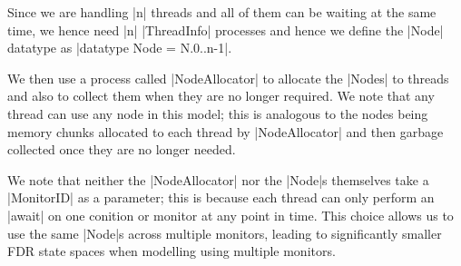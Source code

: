 Since we are handling |n| threads and all of them can be waiting at the same time, we hence need |n| |ThreadInfo| processes and hence we define the |Node| datatype as |datatype Node = N.{0..n-1}|. 



We then use a process called |NodeAllocator| to allocate the |Nodes| to threads and also to collect them when they are no longer required.
We note that any thread can use any node in this model; this is analogous to the nodes being memory chunks allocated to each thread by |NodeAllocator| and then garbage collected once they are no longer needed. 

We note that neither the |NodeAllocator| nor the |Node|s themselves take a |MonitorID| as a parameter; this is because each thread can only perform an |await| on one conition or monitor at any point in time. This choice allows us to use the same |Node|s across multiple monitors, leading to significantly smaller FDR state spaces when modelling using multiple monitors.

